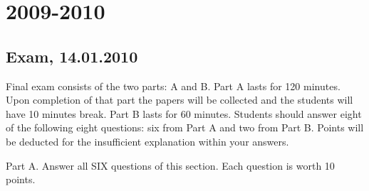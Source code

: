 \documentclass[12pt, a4paper]{article}
\begin{document}
\begin{enumerate}
\end{enumerate}

\section{2009-2010}

\subsection{Exam, 14.01.2010}

Final exam consists of the two parts: A and B. Part A lasts for 120 minutes.
Upon completion of that part the papers will be collected and the students will have 10 minutes break.
Part B lasts for 60 minutes.
Students should answer eight of the following eight questions: six from Part A and two from Part B.
Points will be deducted for the insufficient explanation within your answers.

Part A.
Answer all SIX questions of this section. Each question is worth 10 points.
\end{document}
